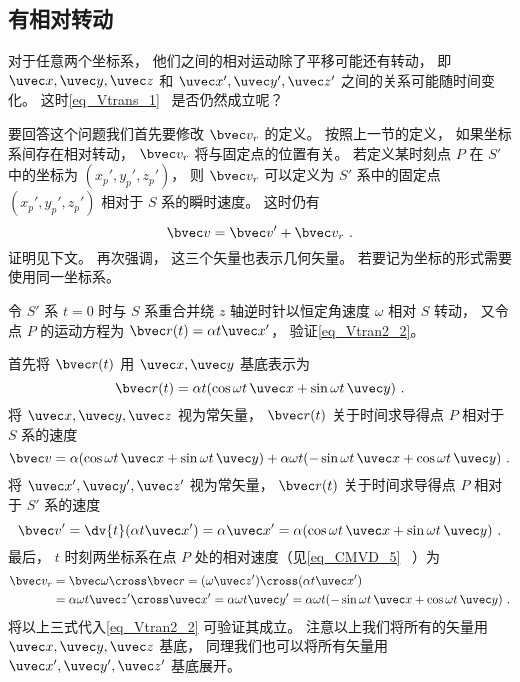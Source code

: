 

\subsection{有相对转动}
对于任意两个坐标系， 他们之间的相对运动除了平移可能还有转动， 即 $\uvec x, \uvec y, \uvec z$ 和 $\uvec x', \uvec y', \uvec z'$ 之间的关系可能随时间变化。 这时\autoref{eq_Vtrans_1}~ 是否仍然成立呢？

要回答这个问题我们首先要修改 $\bvec v_r$ 的定义。 按照上一节的定义， 如果坐标系间存在相对转动， $\bvec v_r$ 将与固定点的位置有关。 若定义某时刻点 $P$ 在 $S'$ 中的坐标为 $(x_p', y_p', z_p')$， 则 $\bvec v_r$ 可以定义为 $S'$ 系中的固定点 $(x_p', y_p', z_p')$ 相对于 $S$ 系的瞬时速度。 这时仍有
\begin{equation}\label{eq_Vtran2_2}
\bvec v = \bvec v' + \bvec v_r~.
\end{equation}
证明见下文。 再次强调， 这三个矢量也表示几何矢量。 若要记为坐标的形式需要使用同一坐标系。

\begin{example}{}\label{ex_Vtran2_1}
令 $S'$ 系 $t = 0$ 时与 $S$ 系重合并绕 $z$ 轴逆时针以恒定角速度 $\omega$ 相对 $S$ 转动， 又令点 $P$ 的运动方程为 $\bvec r(t) = \alpha t \uvec x'$， 验证\autoref{eq_Vtran2_2}。

首先将 $\bvec r(t)$ 用 $\uvec x, \uvec y$ 基底表示为
\begin{equation}
\bvec r(t) = \alpha t (\cos\omega t\, \uvec x + \sin\omega t\, \uvec y)~.
\end{equation}
将 $\uvec x, \uvec y, \uvec z$ 视为常矢量， $\bvec r(t)$ 关于时间求导得点 $P$ 相对于 $S$ 系的速度
\begin{equation}
\bvec v = \alpha (\cos\omega t \,\uvec x + \sin\omega t \,\uvec y)
+ \alpha\omega t (-\sin\omega t \,\uvec x + \cos\omega t \,\uvec y)~.
\end{equation}
将 $\uvec x', \uvec y', \uvec z'$ 视为常矢量， $\bvec r(t)$ 关于时间求导得点 $P$ 相对于 $S'$ 系的速度
\begin{equation}
\bvec v' = \dv{t} (\alpha t \uvec x') = \alpha \uvec x' = \alpha (\cos\omega t\, \uvec x + \sin\omega t \,\uvec y)~.
\end{equation}
最后， $t$ 时刻两坐标系在点 $P$ 处的相对速度（见\autoref{eq_CMVD_5}~ ）为
\begin{equation}\label{eq_Vtran2_3}
\begin{aligned}
\bvec v_r &= \bvec\omega \cross \bvec r = (\omega \uvec z') \cross (\alpha t \uvec x') \\
&= \alpha\omega t \uvec z'\cross\uvec x' = \alpha\omega t \uvec y' = \alpha\omega t(-\sin \omega t \,\uvec x + \cos\omega t \,\uvec y)~.
\end{aligned}\end{equation}
将以上三式代入\autoref{eq_Vtran2_2} 可验证其成立。 注意以上我们将所有的矢量用 $\uvec x, \uvec y, \uvec z$ 基底， 同理我们也可以将所有矢量用 $\uvec x', \uvec y', \uvec z'$ 基底展开。
\end{example}

